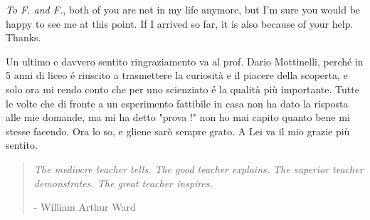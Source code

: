 \textit{To F. and F.}, both of you are not in my life anymore, but I'm sure you would be happy to see me at this point. If I arrived so far, it is also because of your help. Thanks.

Un ultimo e davvero sentito ringraziamento va al prof. Dario Mottinelli, perché in 5 anni di liceo é riuscito a trasmettere la curiosit\`a e il piacere della scoperta, e solo ora mi rendo conto che per uno scienziato é la qualit\`a pi\`u importante. Tutte le volte che di fronte a un esperimento fattibile in casa non ha dato la risposta alle mie domande, ma mi ha detto "prova !" non ho mai capito quanto bene mi stesse facendo. Ora lo so, e gliene sar\`o sempre grato. A Lei va il mio grazie pi\`u sentito.
\blockquote{
\emph{The mediocre teacher tells. The good teacher explains. The superior teacher demonstrates. The great teacher inspires.}
\begin{flushright}
- William Arthur Ward
\end{flushright}
}%
